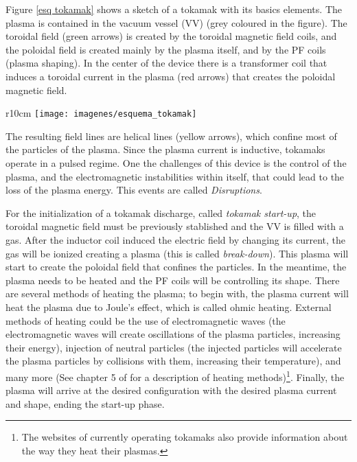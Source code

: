 \documentclass[a4paper,12pt,oneside]{book}
\begin{document}
Figure \ref{esq tokamak} shows a sketch of a tokamak with its basics elements. The plasma is contained in the vacuum vessel (VV) (grey coloured in the figure). The toroidal field (green arrows) is created by the toroidal magnetic field coils, and the poloidal field is created mainly by the plasma itself, and by the PF coils (plasma shaping). In the center of the device there is a transformer coil that induces a toroidal current in the plasma (red arrows) that creates the poloidal magnetic field. 
\begin{wrapfigure}{r}{10cm}
\centering
\texttt{[image: imagenes/esquema\_tokamak]}
\caption{Sketch of a tokamak, showing its basic elements, the field lines and the plasma current. Source: google images, 2019.}
\label{esq tokamak}
\end{wrapfigure} 
%
The resulting field lines are helical lines (yellow arrows), which confine most of the particles of the plasma. Since the plasma current is inductive, tokamaks operate in a pulsed regime. One the challenges of this device is the control of the plasma, and the electromagnetic instabilities within itself, that could lead to the loss of the plasma energy. This events are called \textit{Disruptions}.

For the initialization of a tokamak discharge, called \textit{tokamak start-up}, the toroidal magnetic field must be previously stablished and the VV is filled with a gas. After the inductor coil induced the electric field by changing its current, the gas will be ionized creating a plasma (this is called \textit{break-down}). This plasma will start to create the poloidal field that confines the particles. In the meantime, the plasma needs to be heated and the PF coils will be controlling its shape. There are several methods of heating the plasma; to begin with, the plasma current will heat the plasma due to Joule's effect, which is called ohmic heating. External methods of heating could be the use of electromagnetic waves (the electromagnetic waves will create oscillations of the plasma particles, increasing their energy), injection of neutral particles (the injected particles will accelerate the plasma particles by collisions with them, increasing their temperature), and many more (See chapter 5 of \cite{Wesson} for a description of heating methods)\footnote{The websites of currently operating tokamaks also provide information about the way they heat their plasmas.}. Finally, the plasma will arrive at the desired configuration with the desired plasma current and shape, ending the start-up phase.
\end{document}
